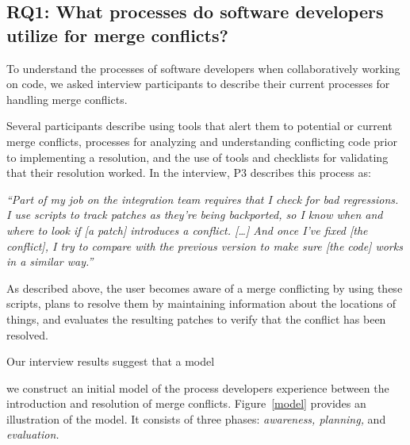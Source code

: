 
\subsection{\textbf{RQ1:} What processes do software developers utilize for merge conflicts?}\label{RQ1}

To understand the processes of software developers when collaboratively working on code, we asked interview participants to describe their current processes for handling merge conflicts.

Several participants describe using tools that alert them to potential or current merge conflicts, processes for analyzing and understanding conflicting code prior to implementing a resolution, and the use of tools and checklists for validating that their resolution worked.
In the interview, P3 describes this process as:
\begin{quoting}
\textit{``Part of my job on the integration team requires that I check for bad regressions. I use scripts to track patches as they're being backported, so I know when and where to look if [a patch] introduces a conflict. [\ldots] And once I've fixed [the conflict], I try to compare with the previous version to make sure [the code] works in a similar way.''}
\end{quoting}
As described above, the user becomes aware of a merge conflicting by using these scripts, plans to resolve them by maintaining information about the locations of things, and evaluates the resulting patches to verify that the conflict has been resolved.

Our interview results suggest that a model 

 we construct an initial model of the process developers experience between the introduction and resolution of merge conflicts.
Figure~\ref{model} provides an illustration of the model.
It consists of three phases: \emph{awareness, planning,} and \emph{evaluation.}

